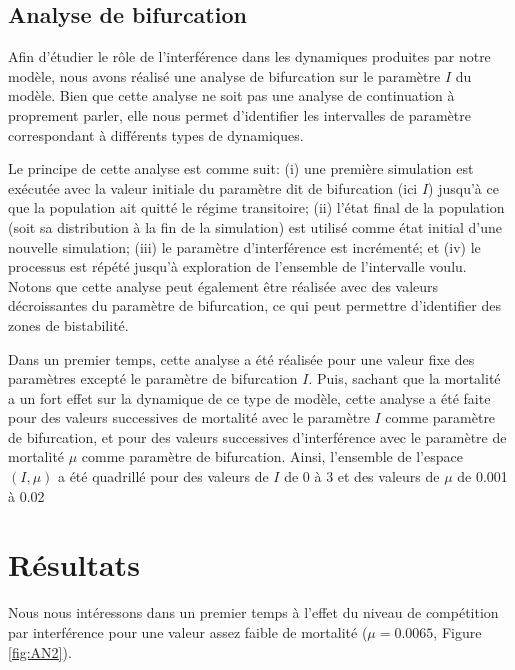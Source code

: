 \subsection{Analyse de bifurcation}

Afin d'étudier le rôle de l'interférence dans les dynamiques produites par notre
modèle, nous avons réalisé une analyse de bifurcation sur le paramètre $I$ du
modèle. Bien que cette analyse ne soit pas une analyse de continuation à
proprement parler, elle nous permet d'identifier les intervalles de paramètre
correspondant à différents types de dynamiques. 

Le principe de cette analyse est comme suit: (i) une première simulation est
exécutée avec la valeur initiale du paramètre dit de bifurcation (ici $I$)
jusqu'à ce que la population ait quitté le régime transitoire; (ii) l'état final
de la population (soit sa distribution à la fin de la simulation) est utilisé
comme état initial d'une nouvelle simulation; (iii) le paramètre d'interférence
est incrémenté; et (iv) le processus est répété jusqu'à exploration de
l'ensemble de l'intervalle voulu. Notons que cette analyse peut également être
réalisée avec des valeurs décroissantes du paramètre de bifurcation, ce qui peut
permettre d'identifier des zones de bistabilité. 

Dans un premier temps, cette analyse a été réalisée pour une valeur fixe des
paramètres excepté le paramètre de bifurcation $I$. Puis, sachant que la
mortalité a un fort effet sur la dynamique de ce type de modèle, cette analyse
a été faite pour des valeurs successives de mortalité avec le paramètre $I$
comme paramètre de bifurcation, et pour des valeurs successives d'interférence
avec le paramètre de mortalité $\mu$ comme paramètre de bifurcation. Ainsi,
l'ensemble de l'espace $(I,\mu)$ a été quadrillé pour des valeurs de $I$ de 0 à
3 et des valeurs de $\mu$ de 0.001 à 0.02

\section{Résultats}

Nous nous intéressons dans un premier temps à l'effet du niveau de compétition
par interférence pour une valeur assez faible de mortalité ($\mu = 0.0065$,
Figure \ref{fig:AN2}). 

